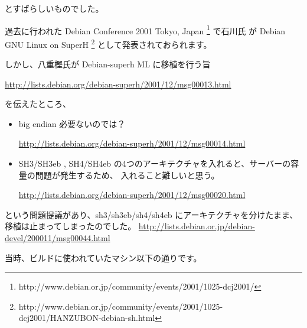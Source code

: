 \documentclass[mingoth,a4paper]{jsarticle}
\begin{document}
とすばらしいものでした。

過去に行われた Debian Conference 2001 Tokyo, Japan \footnote{http://www.debian.or.jp/community/events/2001/1025-dcj2001/}
で石川氏 が Debian GNU Linux on SuperH \footnote{ http://www.debian.or.jp/community/events/2001/1025-dcj2001/HANZUBON-debian-sh.html} として発表されておられます。



しかし、八重樫氏が Debian-superh ML に移植を行う旨

\url{http://lists.debian.org/debian-superh/2001/12/msg00013.html}

を伝えたところ、

\begin{itemize}
	\item big endian 必要ないのでは？
	
		\url{http://lists.debian.org/debian-superh/2001/12/msg00014.html}
		
%	

	\item SH3/SH3eb , SH4/SH4eb の4つのアーキテクチャを入れると、サーバーの容量の問題が発生するため、
		入れること難しいと思う。
		
		\url{http://lists.debian.org/debian-superh/2001/12/msg00020.html}

\end{itemize}
という問題提議があり、sh3/sh3eb/sh4/sh4eb にアーキテクチャを分けたまま、移植は止まってしまったのでした。
\url{http://lists.debian.or.jp/debian-devel/200011/msg00044.html}

当時、ビルドに使われていたマシン以下の通りです。
\end{document}
